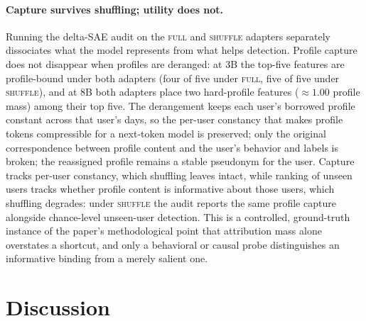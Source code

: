 \documentclass[10pt]{article} %
\begin{document}
\paragraph{Capture survives shuffling; utility does not.}
Running the delta-SAE audit on the \textsc{full} and \textsc{shuffle} adapters
separately dissociates what the model represents from what helps detection.
Profile capture does not disappear when profiles are deranged: at $3$B the
top-five features are profile-bound under both adapters (four of five under
\textsc{full}, five of five under \textsc{shuffle}), and at $8$B both adapters
place two hard-profile features ($\approx\!1.00$ profile mass) among their top
five. The derangement keeps each user's borrowed profile constant across that
user's days, so the per-user constancy that makes profile tokens compressible
for a next-token model is preserved; only the original correspondence between profile content and the user's
behavior and labels is broken; the reassigned profile remains a stable
pseudonym for the user. Capture tracks per-user constancy, which shuffling
leaves intact, while ranking of unseen users tracks whether profile content
is informative about those users, which shuffling degrades: under
\textsc{shuffle} the audit reports the same profile capture alongside
chance-level unseen-user detection. This is a controlled, ground-truth
instance of the paper's methodological point that attribution mass alone
overstates a shortcut, and only a behavioral or causal probe distinguishes an
informative binding from a merely salient one.



\section{Discussion}
\label{sec:discussion}
\end{document}
